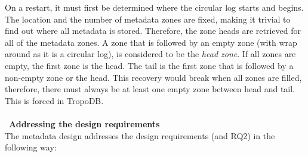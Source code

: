 On a restart, it must first be determined where the circular log starts and begins. The location and the number of metadata zones are fixed, making it trivial to find out where all metadata is stored. Therefore, the zone heads are retrieved for all of the metadata zones. A zone that is followed by an empty zone (with wrap around as it is a circular log), is considered to be the \textit{head zone}. If all zones are empty, the first zone is the head. The tail is the first zone that is followed by a non-empty zone or the head. This recovery would break when all zones are filled, therefore, there must always be at least one empty zone between head and tail. This is forced in TropoDB.\\\\\
\textbf{Addressing the design requirements}\\
The metadata design addresses the design requirements (and RQ2) in the following way:
